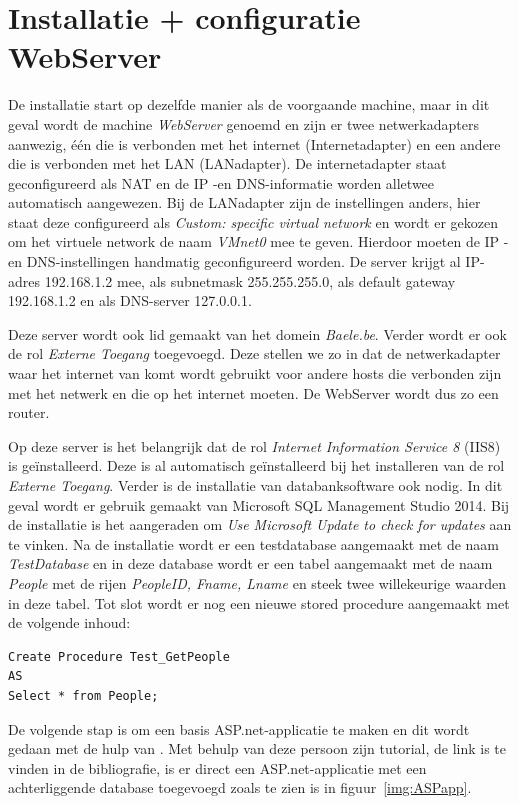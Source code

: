 \documentclass[pdftex,a4paper,12pt]{report}
\begin{document}
\section{Installatie + configuratie WebServer}
De installatie start op dezelfde manier als de voorgaande machine, maar in dit geval wordt de machine \textit{WebServer} genoemd en zijn er twee netwerkadapters aanwezig, één die is verbonden met het internet (Internetadapter) en een andere die is verbonden met het LAN (LANadapter). De internetadapter staat geconfigureerd als NAT en de IP -en DNS-informatie worden alletwee automatisch aangewezen. Bij de LANadapter zijn de instellingen anders, hier staat deze configureerd als \textit{Custom: specific virtual network} en wordt er gekozen om het virtuele network de naam \textit{VMnet0} mee te geven. Hierdoor moeten de IP -en DNS-instellingen handmatig geconfigureerd worden. De server krijgt al IP-adres 192.168.1.2 mee, als subnetmask 255.255.255.0, als default gateway 192.168.1.2 en als DNS-server 127.0.0.1. \newline 

Deze server wordt ook lid gemaakt van het domein \textit{Baele.be}. Verder wordt er ook de rol \textit{Externe Toegang} toegevoegd. Deze stellen we zo in dat de netwerkadapter waar het internet van komt wordt gebruikt voor andere hosts die verbonden zijn met het netwerk en die op het internet moeten. De WebServer wordt dus zo een router. \newline

Op deze server is het belangrijk dat de rol \textit{Internet Information Service 8} (IIS8) is geïnstalleerd. Deze is al automatisch geïnstalleerd bij het installeren van de rol \textit{Externe Toegang}. Verder is de installatie van databanksoftware ook nodig. In dit geval wordt er gebruik gemaakt van Microsoft SQL Management Studio 2014. Bij de installatie is het aangeraden om \textit{Use Microsoft Update to check for updates} aan te vinken. Na de installatie wordt er een testdatabase aangemaakt met de naam \textit{TestDatabase} en in deze database wordt er een tabel aangemaakt met de naam \textit{People} met de rijen \textit{PeopleID, Fname, Lname} en steek twee willekeurige waarden in deze tabel. Tot slot wordt er nog een nieuwe stored procedure aangemaakt met de volgende inhoud:
\begin{verbatim}
Create Procedure Test_GetPeople
AS
Select * from People;
\end{verbatim}

De volgende stap is om een basis ASP.net-applicatie te maken en dit wordt gedaan met de hulp van \cite{Nuckolls2011}. Met behulp van deze persoon zijn tutorial, de link is te vinden in de bibliografie, is er direct een ASP.net-applicatie met een achterliggende database toegevoegd zoals te zien is in figuur~\ref{img:ASPapp}. \newline
\end{document}
